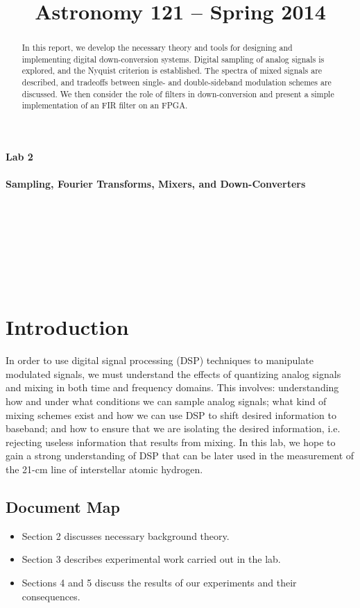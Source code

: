 \documentclass[11pt]{article}
\title{Astronomy 121 -- Spring 2014}
\author{\Name}
\def\HW{2} %
\begin{document}
\maketitle
\begin{center}
{\LARGE {\bf Lab \HW \\~\\ Sampling, Fourier Transforms, Mixers, and Down-Converters}} \\
~\\
~\\
~\\
~\\
~\\
~\\
~\\
\end{center}

\begin{abstract}
    In this report, we develop the necessary theory and tools for designing and implementing digital down-conversion systems. Digital sampling of analog signals is explored, and the Nyquist criterion is established. The spectra of mixed signals are described, and tradeoffs between single- and double-sideband modulation schemes are discussed. We then consider the role of filters in down-conversion and present a simple implementation of an FIR filter on an FPGA.
\end{abstract}

\newpage

\section{Introduction}
In order to use digital signal processing (DSP) techniques to manipulate modulated signals, we must understand the effects of quantizing analog signals and mixing in both time and frequency domains. This involves: understanding how and under what conditions we can sample analog signals; what kind of mixing schemes exist and how we can use DSP to shift desired information to baseband; and how to ensure that we are isolating the desired information, i.e. rejecting useless information that results from mixing. In this lab, we hope to gain a strong understanding of DSP that can be later used in the measurement of the 21-cm line of interstellar atomic hydrogen.

    \subsection{Document Map}
    \begin{itemize}
        \item
            Section 2 discusses necessary background theory.
        \item
            Section 3 describes experimental work carried out in the lab.
        \item
            Sections 4 and 5 discuss the results of our experiments and their consequences.
    \end{itemize}
\end{document}
